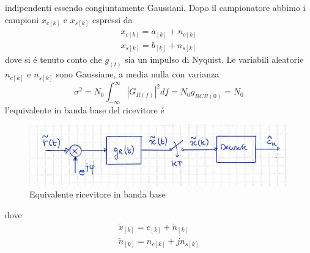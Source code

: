             indipendenti essendo congiuntamente Gaussiani. Dopo il campionatore abbimo i campioni $x_{c[k]}$ e $x_{s[k]}$ espressi da 
            \begin{gather}
                x_{c[k]} = a_{[k]}+n_{c[k]}\nonumber \\
                x_{s[k]} = b_{[k]}+n_{s[k]}\nonumber
            \end{gather}
            dove si é tenuto conto che $g_{(t)}$ sia un impulso di Nyquist. Le variabili aleatorie $n_{c[k]}$ e $n_{s[k]}$ sono 
            Gaussiane, a media nulla con varianza 
            \[
                \sigma^2 = N_0\int_{-\infty}^{\infty}\left|G_{R(f)}\right|^2df= N_0g_{RCR(0)} = N_0
            \]
            l'equivalente in banda base del ricevitore é 
            \begin{figure}[H]
                \centering
                \includegraphics[width = 12cm]{media/equivalente in banda base ricevitore qam.png}
                \caption{Equivalente ricevitore in banda base}
            \end{figure}
            dove
            \begin{gather}
                \tilde{x}_{[k]} = c_{[k]}+\tilde{n}_{[k]} \nonumber \\
                \tilde{n}_{[k]} = n_{c[k]}+jn_{s[k]} \nonumber 
            \end{gather}
